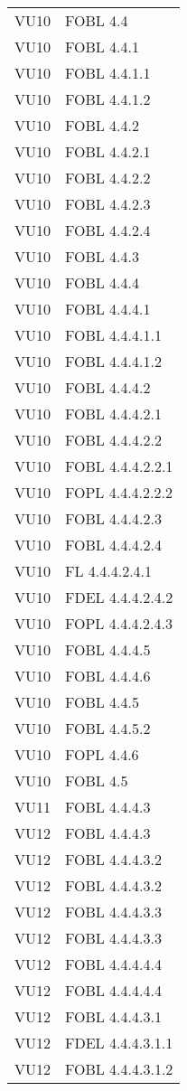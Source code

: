 \begin{longtable}{XX}
VU10&FOBL 4.4\\ 
VU10&FOBL 4.4.1\\ 
VU10&FOBL 4.4.1.1\\ 
VU10&FOBL 4.4.1.2\\ 
VU10&FOBL 4.4.2\\ 
VU10&FOBL 4.4.2.1\\ 
VU10&FOBL 4.4.2.2\\ 
VU10&FOBL 4.4.2.3\\ 
VU10&FOBL 4.4.2.4\\ 
VU10&FOBL 4.4.3\\ 
VU10&FOBL 4.4.4\\ 
VU10&FOBL 4.4.4.1\\ 
VU10&FOBL 4.4.4.1.1\\ 
VU10&FOBL 4.4.4.1.2\\ 
VU10&FOBL 4.4.4.2\\ 
VU10&FOBL 4.4.4.2.1\\ 
VU10&FOBL 4.4.4.2.2\\ 
VU10&FOBL 4.4.4.2.2.1\\ 
VU10&FOPL 4.4.4.2.2.2\\ 
VU10&FOBL 4.4.4.2.3\\ 
VU10&FOBL 4.4.4.2.4\\ 
VU10&FL 4.4.4.2.4.1\\ 
VU10&FDEL 4.4.4.2.4.2\\ 
VU10&FOPL 4.4.4.2.4.3\\ 
VU10&FOBL 4.4.4.5\\ 
VU10&FOBL 4.4.4.6\\ 
VU10&FOBL 4.4.5\\ 
VU10&FOBL 4.4.5.2\\ 
VU10&FOPL 4.4.6\\ 
VU10&FOBL 4.5\\ 
\midrule 
VU11&FOBL 4.4.4.3\\ 
\midrule 
VU12&FOBL 4.4.4.3\\ 
\midrule 
VU12&FOBL 4.4.4.3.2\\ 
\midrule 
VU12&FOBL 4.4.4.3.2\\ 
\midrule 
VU12&FOBL 4.4.4.3.3\\ 
\midrule 
VU12&FOBL 4.4.4.3.3\\ 
\midrule 
VU12&FOBL 4.4.4.4.4\\ 
\midrule 
VU12&FOBL 4.4.4.4.4\\ 
\midrule 
VU12&FOBL 4.4.4.3.1\\ 
VU12&FDEL 4.4.4.3.1.1\\ 
VU12&FOBL 4.4.4.3.1.2\\ 

\end{longtable}
